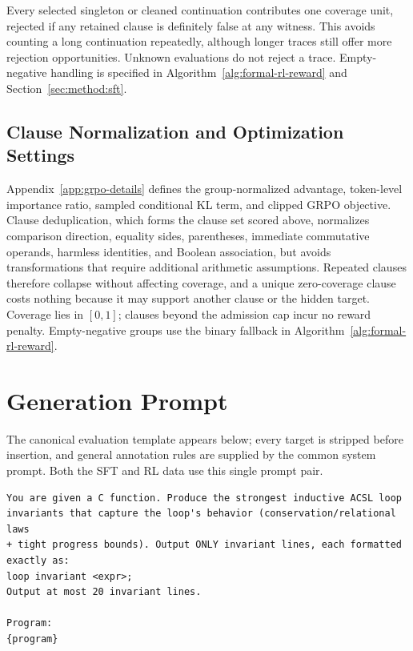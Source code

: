 Every selected singleton or cleaned continuation contributes one coverage
unit, rejected if any retained clause is definitely false at any witness.
This avoids counting a long continuation repeatedly, although longer traces
still offer more rejection opportunities.  Unknown evaluations do not reject
a trace.  Empty-negative handling is specified in
Algorithm~\ref{alg:formal-rl-reward} and Section~\ref{sec:method:sft}.

\subsection{Clause Normalization and Optimization Settings}

Appendix~\ref{app:grpo-details} defines the group-normalized advantage,
token-level importance ratio, sampled conditional KL term, and clipped GRPO
objective.  Clause deduplication, which forms the clause set scored above,
normalizes comparison direction, equality sides, parentheses, immediate
commutative operands, harmless identities, and Boolean association, but
avoids transformations that require additional arithmetic assumptions.
Repeated clauses therefore collapse without affecting coverage, and a
unique zero-coverage clause costs nothing because it may support another
clause or the hidden target.  Coverage lies in
\([0,1]\); clauses beyond the admission cap incur no reward penalty.
Empty-negative groups use the binary fallback in
Algorithm~\ref{alg:formal-rl-reward}.

\section{Generation Prompt}
\label{app:prompt}

The canonical evaluation template appears below; every target is
stripped before insertion, and general annotation rules are supplied
by the common system prompt.  Both the SFT and RL data use this single prompt
pair.

\begin{promptbox}
\begin{lstlisting}[style=promptstyle]
You are given a C function. Produce the strongest inductive ACSL loop
invariants that capture the loop's behavior (conservation/relational laws
+ tight progress bounds). Output ONLY invariant lines, each formatted
exactly as:
loop invariant <expr>;
Output at most 20 invariant lines.

Program:
{program}
\end{lstlisting}
\end{promptbox}

